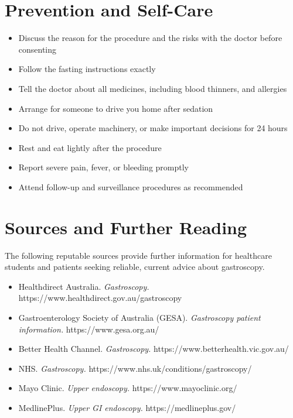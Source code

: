 \section*{Prevention and Self-Care}
\begin{itemize}
    \item Discuss the reason for the procedure and the risks with the doctor before consenting
    \item Follow the fasting instructions exactly
    \item Tell the doctor about all medicines, including blood thinners, and allergies
    \item Arrange for someone to drive you home after sedation
    \item Do not drive, operate machinery, or make important decisions for 24 hours
    \item Rest and eat lightly after the procedure
    \item Report severe pain, fever, or bleeding promptly
    \item Attend follow-up and surveillance procedures as recommended
\end{itemize}

\section*{Sources and Further Reading}
The following reputable sources provide further information for healthcare students and patients seeking reliable, current advice about gastroscopy.
\begin{itemize}
    \item Healthdirect Australia. \textit{Gastroscopy.} https://www.healthdirect.gov.au/gastroscopy
    \item Gastroenterology Society of Australia (GESA). \textit{Gastroscopy patient information.} https://www.gesa.org.au/
    \item Better Health Channel. \textit{Gastroscopy.} https://www.betterhealth.vic.gov.au/
    \item NHS. \textit{Gastroscopy.} https://www.nhs.uk/conditions/gastroscopy/
    \item Mayo Clinic. \textit{Upper endoscopy.} https://www.mayoclinic.org/
    \item MedlinePlus. \textit{Upper GI endoscopy.} https://medlineplus.gov/
\end{itemize}
